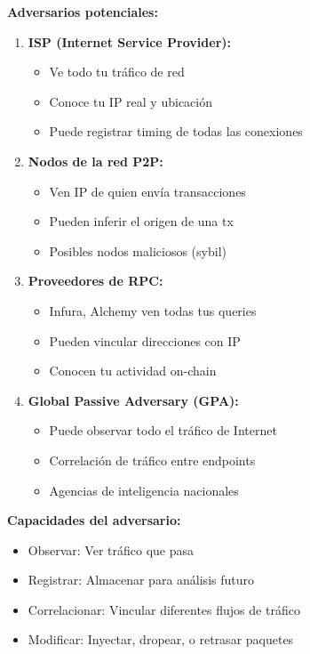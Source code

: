 \documentclass[11pt,a4paper,twoside]{book}
\theoremstyle{definition}
\theoremstyle{remark}
\begin{document}
\begin{mathnote}
\textbf{Adversarios potenciales:}
\begin{enumerate}
    \item \textbf{ISP (Internet Service Provider):}
    \begin{itemize}
        \item Ve todo tu tráfico de red
        \item Conoce tu IP real y ubicación
        \item Puede registrar timing de todas las conexiones
    \end{itemize}
    
    \item \textbf{Nodos de la red P2P:}
    \begin{itemize}
        \item Ven IP de quien envía transacciones
        \item Pueden inferir el origen de una tx
        \item Posibles nodos maliciosos (sybil)
    \end{itemize}
    
    \item \textbf{Proveedores de RPC:}
    \begin{itemize}
        \item Infura, Alchemy ven todas tus queries
        \item Pueden vincular direcciones con IP
        \item Conocen tu actividad on-chain
    \end{itemize}
    
    \item \textbf{Global Passive Adversary (GPA):}
    \begin{itemize}
        \item Puede observar todo el tráfico de Internet
        \item Correlación de tráfico entre endpoints
        \item Agencias de inteligencia nacionales
    \end{itemize}
\end{enumerate}

\textbf{Capacidades del adversario:}
\begin{itemize}
    \item Observar: Ver tráfico que pasa
    \item Registrar: Almacenar para análisis futuro
    \item Correlacionar: Vincular diferentes flujos de tráfico
    \item Modificar: Inyectar, dropear, o retrasar paquetes
\end{itemize}
\end{mathnote}
\end{document}
